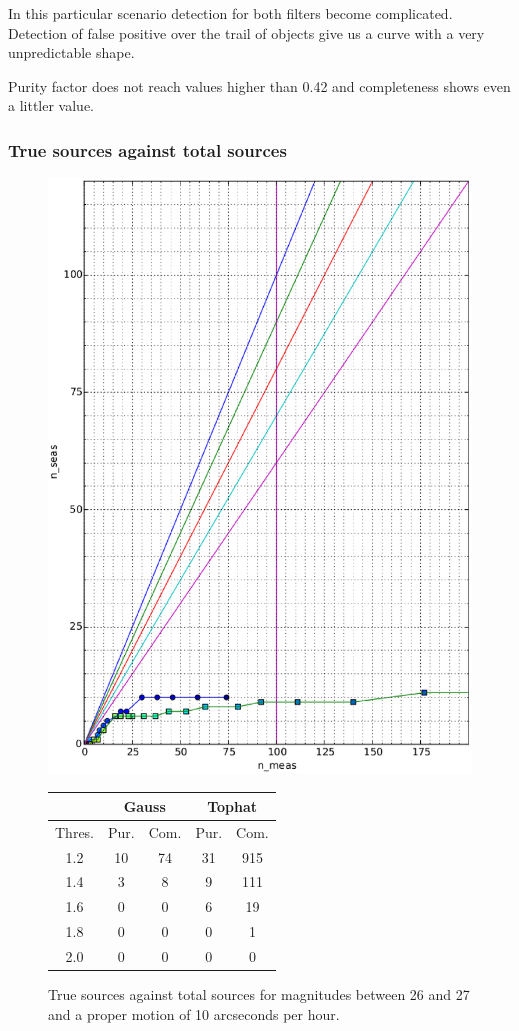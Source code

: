 \documentclass{article}
\begin{document}
In this particular scenario detection for both filters become complicated. Detection of false positive over the trail of objects give us a curve with a very unpredictable shape.

Purity factor does not reach values higher than 0.42 and completeness shows even a littler value.

\subsubsection{True sources against total sources}

\begin{figure}[H]
\centering
\includegraphics[width=.55\linewidth]{images/26_27_10_d.eps}
\qquad
\begin{tabular}[b]{|c|c|c|c|c|}\hline
\multicolumn{1}{|c|}{} & \multicolumn{2}{c|}{Gauss} & \multicolumn{2}{c|}{Tophat} \\
\hline \hline
Thres. & Pur. & Com. & Pur. & Com.\\
\hline
1.2 & 10 & 74 & 31 & 915\\
\hline
1.4 & 3 & 8 & 9 & 111\\
\hline
1.6 & 0 & 0 & 6 & 19\\
\hline
1.8 & 0 & 0 & 0 & 1\\
\hline
2.0 & 0 & 0 & 0 & 0\\
\hline
\end{tabular}
\captionsetup{labelformat=andtable}
\caption{True sources against total sources for magnitudes between 26 and 27 and a proper motion of 10 arcseconds per hour.}
\end{figure}
\end{document}
